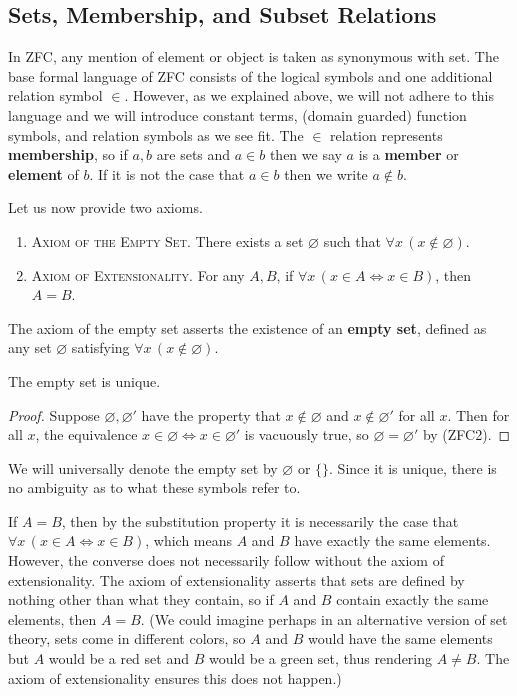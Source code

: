 \subsection{Sets, Membership, and Subset Relations}

In ZFC, any mention of element or object is taken as synonymous with set. 
The base formal language of ZFC consists of the logical symbols and one additional relation symbol $\in$.
However, as we explained above, we will not adhere to this language and we will introduce constant terms, (domain guarded) function symbols, and relation symbols as we see fit. 
The $\in$ relation represents \textbf{membership}, so if $a, b$ are sets and $a\in b$ then we say $a$ is a \textbf{member} or \textbf{element} of $b$.
If it is not the case that $a\in b$ then we write $a\notin b$. 

Let us now provide two axioms.

\begin{enumerate}[itemsep=-0.4ex, label=\textup{(ZFC${\arabic*}$)}]
	\item\textsc{Axiom of the Empty Set.}
	There exists a set $\varnothing$ such that $\forall x\, (x\notin\varnothing)$. 
	\item\textsc{Axiom of Extensionality.}
	For any $A, B$, if $\forall x\, (x\in A\iff x\in B)$, then $A = B$.
\end{enumerate}

\noindent The axiom of the empty set asserts the existence of an \textbf{empty set}, defined as any set $\varnothing$ satisfying $\forall x\, (x\notin\varnothing)$.

\begin{prop}
	The empty set is unique.
\end{prop}
\begin{proof}
	Suppose $\varnothing, \varnothing'$ have the property that $x\notin\varnothing$ and $x\notin\varnothing'$ for all $x$.
	Then for all $x$, the equivalence $x\in\varnothing\iff x\in\varnothing'$ is vacuously true, so $\varnothing = \varnothing'$ by (ZFC2).
\end{proof}

\noindent We will universally denote the empty set by $\varnothing$ or $\{\}$.
Since it is unique, there is no ambiguity as to what these symbols refer to. 

If $A = B$, then by the substitution property it is necessarily the case that $\forall x\, (x\in A\iff x\in B)$, which means $A$ and $B$ have exactly the same elements. 
However, the converse does not necessarily follow without the axiom of extensionality. 
The axiom of extensionality asserts that sets are defined by nothing other than what they contain, so if $A$ and $B$ contain exactly the same elements, then $A = B$. 
(We could imagine perhaps in an alternative version of set theory, sets come in different colors, so $A$ and $B$ would have the same elements but $A$ would be a red set and $B$ would be a green set, thus rendering $A\ne B$.
The axiom of extensionality ensures this does not happen.)

